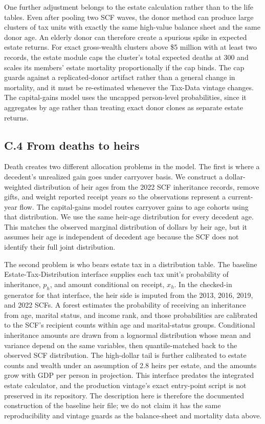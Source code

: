 \documentclass[10pt,twocolumn]{article}
\begin{document}
One further adjustment belongs to the estate calculation rather than to
the life tables. Even after pooling two SCF waves, the donor method can
produce large clusters of tax units with exactly the same high-value
balance sheet and the same donor age. An elderly donor can therefore
create a spurious spike in expected estate returns. For exact
gross-wealth clusters above \$5 million with at least two records, the
estate module caps the cluster's total expected deaths at 300 and scales
its members' estate mortality proportionally if the cap binds. The cap guards against a replicated-donor artifact rather than a general
change in mortality, and it must be re-estimated whenever the Tax-Data
vintage changes. The capital-gains model uses the uncapped person-level
probabilities, since it aggregates by age rather than treating exact
donor clones as separate estate returns.

\subsection*{C.4 From deaths to heirs}

Death creates two different allocation problems in the model. The first
is where a decedent's unrealized gain goes under carryover basis. We
construct a dollar-weighted distribution of heir ages from the 2022 SCF
inheritance records, remove gifts, and weight reported receipt years so
the observations represent a current-year flow. The capital-gains model
routes carryover gains to age cohorts using that distribution. We use
the same heir-age distribution for every decedent age. This matches the
observed marginal distribution of dollars by heir age, but it assumes
heir age is independent of decedent age because the SCF does not
identify their full joint distribution.

The second problem is who bears estate tax in a distribution table. The
baseline Estate-Tax-Distribution interface supplies each tax unit's
probability of inheritance, \(p_h\), and amount conditional on receipt,
\(x_h\). In the checked-in generator for that interface, the heir side
is imputed from the 2013, 2016, 2019, and 2022 SCFs. A forest estimates
the probability of receiving an inheritance from age, marital status,
and income rank, and those probabilities are calibrated to the SCF's
recipient counts within age and marital-status groups. Conditional
inheritance amounts are drawn from a lognormal distribution whose mean
and variance depend on the same variables, then quantile-matched back to
the observed SCF distribution. The high-dollar tail is further
calibrated to estate counts and wealth under an assumption of 2.8 heirs
per estate, and the amounts grow with GDP per person in projection. This
interface predates the integrated estate calculator, and the production
vintage's exact entry-point script is not preserved in its repository.
The description here is therefore the documented construction of the
baseline heir file; we do not claim it has the same reproducibility and
vintage guards as the balance-sheet and mortality data above.
\end{document}
